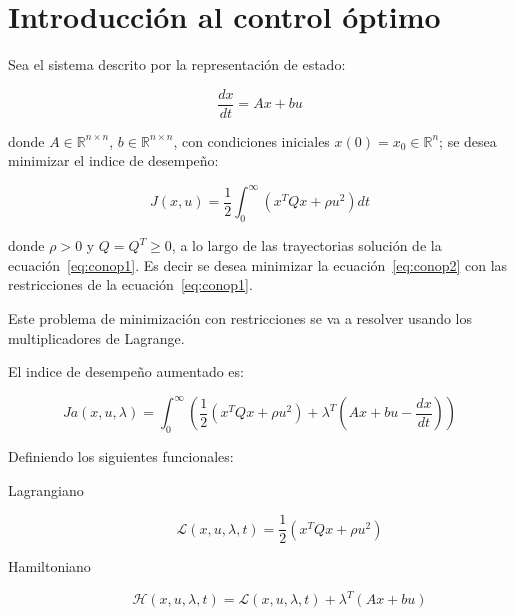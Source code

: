 
\chapter{Introducción al control óptimo}

    Sea el sistema descrito por la representación de estado:

    \begin{equation} \label{eq:conop1}
        \frac{dx}{dt} = A x + b u
    \end{equation}

    donde $A \in \mathbb{R}^{n \times n}$, $b \in \mathbb{R}^{n \times n}$, con condiciones iniciales $x(0) = x_0 \in \mathbb{R}^n$; se desea minimizar el indice de desempeño:

    \begin{equation} \label{eq:conop2}
        J(x, u) = \frac{1}{2} \int_0^{\infty} \left( x^T Q x + \rho u^2 \right) dt
    \end{equation}

    donde $\rho > 0$ y $Q = Q^T \ge 0$, a lo largo de las trayectorias solución de la ecuación~\ref{eq:conop1}. Es decir se desea minimizar la ecuación~\ref{eq:conop2} con las restricciones de la ecuación~\ref{eq:conop1}.

    Este problema de minimización con restricciones se va a resolver usando los multiplicadores de Lagrange.

    El indice de desempeño aumentado es:

    \begin{equation*}
        Ja(x, u, \lambda) = \int_0^{\infty} \left( \frac{1}{2}  \left( x^T Q x + \rho u^2 \right) + \lambda^T \left( Ax + bu - \frac{dx}{dt} \right) \right)
    \end{equation*}

    Definiendo los siguientes funcionales:

    \begin{description}
        \item [Lagrangiano]
        \begin{equation}
            \mathscr{L}(x, u, \lambda, t) = \frac{1}{2} \left( x^T Q x + \rho u^2 \right)
        \end{equation}
        \item [Hamiltoniano]
        \begin{equation}
            \mathscr{H}(x, u, \lambda, t) = \mathscr{L}(x, u, \lambda, t) + \lambda^T (A x + b u)
        \end{equation}
    \end{description}

